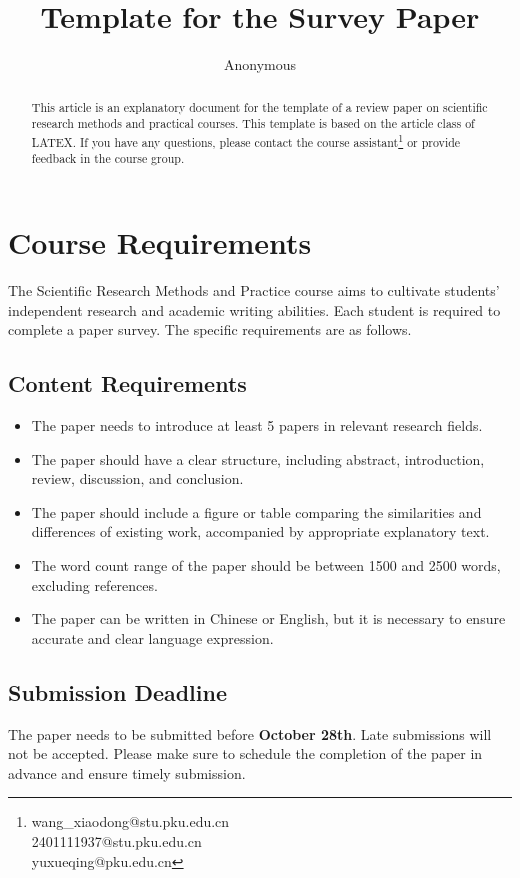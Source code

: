 \documentclass[11pt,en]{elegantpaper}
\title{Template for the Survey Paper}
\author{Anonymous}
\institute{Anonymous}
\begin{document}
\maketitle

\begin{abstract}
This article is an explanatory document for the template of a review paper on scientific research methods and practical courses. This template is based on the article class of LATEX. If you have any questions, please contact the course assistant\footnote[1]{wang\_xiaodong@stu.pku.edu.cn\\2401111937@stu.pku.edu.cn\\ yuxueqing@pku.edu.cn} or provide feedback in the course group.

\end{abstract}


\section{Course Requirements}

The Scientific Research Methods and Practice course aims to cultivate students' independent research and academic writing abilities. Each student is required to complete a paper survey. The specific requirements are as follows.

\subsection{Content Requirements}
\begin{itemize}
    \item The paper needs to introduce at least 5 papers in relevant research fields.
    \item The paper should have a clear structure, including abstract, introduction, review, discussion, and conclusion.
    \item The paper should include a figure or table comparing the similarities and differences of existing work, accompanied by appropriate explanatory text.
    \item The word count range of the paper should be between 1500 and 2500 words, excluding references.
    \item The paper can be written in Chinese or English, but it is necessary to ensure accurate and clear language expression.
\end{itemize}

\subsection{Submission Deadline}
The paper needs to be submitted before \textbf{October 28th}. Late submissions will not be accepted. Please make sure to schedule the completion of the paper in advance and ensure timely submission.
\end{document}
